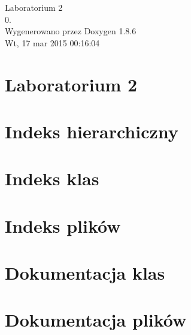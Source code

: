\documentclass[twoside]{article}
\begin{document}
\hypersetup{pageanchor=false}
\begin{titlepage}
\vspace*{7cm}
\begin{center}%
{\Large Laboratorium 2 \\[1ex]\large 0. }\\
\vspace*{1cm}
{\large Wygenerowano przez Doxygen 1.8.6}\\
\vspace*{0.5cm}
{\small Wt, 17 mar 2015 00:16:04}\\
\end{center}
\end{titlepage}
\tableofcontents
{}
\hypersetup{pageanchor=true}

\section{Laboratorium 2}
\label{index}\hypertarget{index}{}
\section{Indeks hierarchiczny}

\section{Indeks klas}

\section{Indeks plików}

\section{Dokumentacja klas}








\section{Dokumentacja plików}


























\newpage
{}
{}
\printindex
\end{document}
